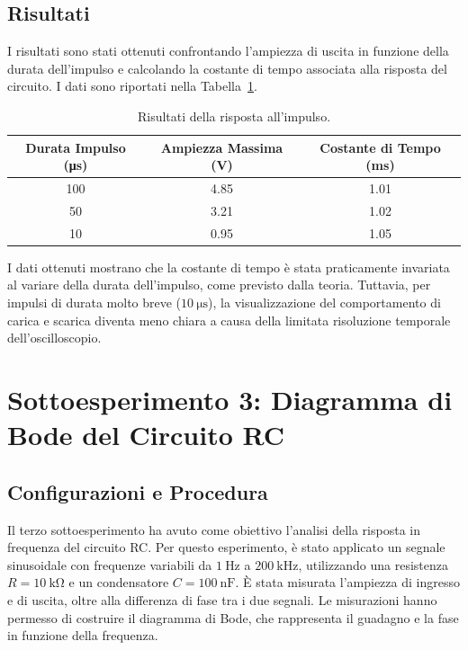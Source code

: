 \documentclass[a4paper,10pt]{article}
\begin{document}
\subsection*{Risultati}
I risultati sono stati ottenuti confrontando l'ampiezza di uscita in funzione della durata dell'impulso e calcolando la costante di tempo associata alla risposta del circuito. I dati sono riportati nella Tabella~\ref{tab:rc_impulse_response}.

\begin{table}[H]
\centering
\begin{tabular}{|c|c|c|}
\hline
\textbf{Durata Impulso (\si{\micro\second})} & \textbf{Ampiezza Massima (\si{\volt})} & \textbf{Costante di Tempo (\si{\milli\second})} \\ \hline
100 & 4.85 & 1.01 \\ \hline
50 & 3.21 & 1.02 \\ \hline
10 & 0.95 & 1.05 \\ \hline
\end{tabular}
\caption{Risultati della risposta all’impulso.}
\label{tab:rc_impulse_response}
\end{table}

I dati ottenuti mostrano che la costante di tempo è stata praticamente invariata al variare della durata dell'impulso, come previsto dalla teoria. Tuttavia, per impulsi di durata molto breve (\(\SI{10}{\micro\second}\)), la visualizzazione del comportamento di carica e scarica diventa meno chiara a causa della limitata risoluzione temporale dell'oscilloscopio.


\section{Sottoesperimento 3: Diagramma di Bode del Circuito RC}
\subsection{Configurazioni e Procedura}
Il terzo sottoesperimento ha avuto come obiettivo l'analisi della risposta in frequenza del circuito RC. Per questo esperimento, è stato applicato un segnale sinusoidale con frequenze variabili da \(\SI{1}{\hertz}\) a \(\SI{200}{\kilo\hertz}\), utilizzando una resistenza \( R = \SI{10}{\kilo\ohm} \) e un condensatore \( C = \SI{100}{\nano\farad} \). È stata misurata l'ampiezza di ingresso e di uscita, oltre alla differenza di fase tra i due segnali. Le misurazioni hanno permesso di costruire il diagramma di Bode, che rappresenta il guadagno e la fase in funzione della frequenza.
\end{document}
